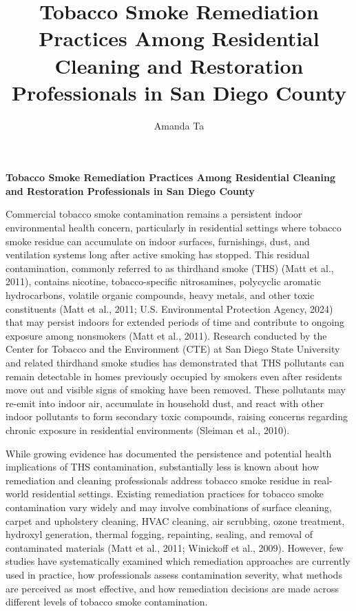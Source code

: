\documentclass[stu]{apa7}
\title{Tobacco Smoke Remediation Practices Among Residential Cleaning and Restoration Professionals in San Diego County}
\author{Amanda Ta}
\affiliation{School of Public Health, San Diego State University}
\begin{document}
\maketitle

\begin{center}
\textbf{Tobacco Smoke Remediation Practices Among Residential Cleaning and Restoration Professionals in San Diego County}
\end{center}

Commercial tobacco smoke contamination remains a persistent indoor environmental health concern, particularly in residential settings where tobacco smoke residue can accumulate on indoor surfaces, furnishings, dust, and ventilation systems long after active smoking has stopped. This residual contamination, commonly referred to as thirdhand smoke (THS) (Matt et al., 2011), contains nicotine, tobacco-specific nitrosamines, polycyclic aromatic hydrocarbons, volatile organic compounds, heavy metals, and other toxic constituents (Matt et al., 2011; U.S. Environmental Protection Agency, 2024) that may persist indoors for extended periods of time and contribute to ongoing exposure among nonsmokers (Matt et al., 2011). Research conducted by the Center for Tobacco and the Environment (CTE) at San Diego State University and related thirdhand smoke studies has demonstrated that THS pollutants can remain detectable in homes previously occupied by smokers even after residents move out and visible signs of smoking have been removed. These pollutants may re-emit into indoor air, accumulate in household dust, and react with other indoor pollutants to form secondary toxic compounds, raising concerns regarding chronic exposure in residential environments (Sleiman et al., 2010).

While growing evidence has documented the persistence and potential health implications of THS contamination, substantially less is known about how remediation and cleaning professionals address tobacco smoke residue in real-world residential settings. Existing remediation practices for tobacco smoke contamination vary widely and may involve combinations of surface cleaning, carpet and upholstery cleaning, HVAC cleaning, air scrubbing, ozone treatment, hydroxyl generation, thermal fogging, repainting, sealing, and removal of contaminated materials (Matt et al., 2011; Winickoff et al., 2009). However, few studies have systematically examined which remediation approaches are currently used in practice, how professionals assess contamination severity, what methods are perceived as most effective, and how remediation decisions are made across different levels of tobacco smoke contamination.
\end{document}
